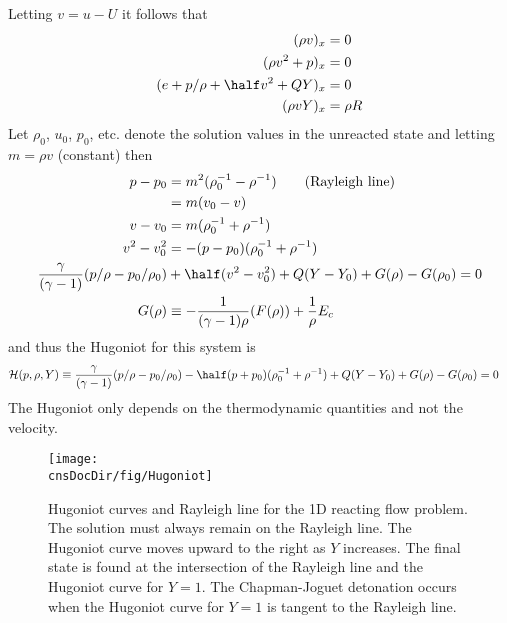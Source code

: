 \documentclass{article}
\newcommand{\obDir}{\homeHenshaw/res/OverBlown}
\newcommand{\cnsDocDir}{\homeHenshaw/cgDoc/cns}
\begin{document}
Letting $v=u-U$ it follows that 
\begin{align*}
  (\rho v)_x &=0 \\
  (\rho v^2 + p )_x &=0 \\
  (e + p/\rho + \half v^2 + Q Y )_x &=0 \\
   (\rho v Y)_x &= \rho R 
\end{align*}
Let $\rho_0$, $u_0$, $p_0$, etc. denote the solution values in the unreacted state and
letting $m=\rho v$ (constant) then
\begin{align*}
   p - p_0 &= m^2 ( \rho_0^{-1} - \rho^{-1} ) \qquad\mbox{(Rayleigh line)} \\
           & = m ( v_0 - v )  \\
   v - v_0 &= m( \rho_0^{-1} + \rho^{-1} ) \\
    v^2 - v_0^2 &= -(p - p_0)( \rho_0^{-1} + \rho^{-1} ) \\
   {\gamma\over (\gamma-1)} (p/\rho - p_0/\rho_0 ) &+ \half( v^2 - v_0^2) + Q(Y-Y_0) + G(\rho)-G(\rho_0) =0\\
   G(\rho) &\equiv - {1\over (\gamma-1)\rho} (F(\rho) ) + {1 \over \rho} E_c 
\end{align*}
and thus the Hugoniot for this system is 
\begin{align*}
  {\cal H}(p,\rho,Y) &\equiv 
      {\gamma\over (\gamma-1)} (p/\rho - p_0/\rho_0 ) -\half(p + p_0)( \rho_0^{-1} + \rho^{-1} ) 
           + Q(Y-Y_0) + G(\rho)-G(\rho_0) =0
\end{align*}
The Hugoniot only depends on the thermodynamic quantities and not the velocity.


\begin{figure}[hbt]
  \begin{center}
    \texttt{[image: \\cnsDocDir/fig/Hugoniot]}
  \end{center}
\caption{Hugoniot curves and Rayleigh line for the 1D reacting flow problem. The solution must always remain
  on the Rayleigh line. The Hugoniot curve moves upward to the right as $Y$ increases. The final state
   is found at the intersection of the Rayleigh line and the Hugoniot curve for $Y=1$. The Chapman-Joguet
detonation occurs when the Hugoniot curve for $Y=1$ is tangent to the Rayleigh line.} \label{fig:Hugoniot}
\end{figure}

\end{document}
